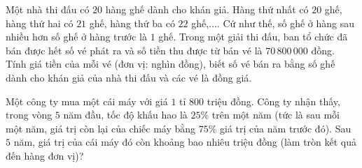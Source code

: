 \begin{bt}%
	Một nhà thi đấu có $20$ hàng ghế dành cho khán giả. Hàng thứ nhất có $20$ ghế, hàng thứ hai có $21$ ghế, hàng thứ ba có $22$ ghế,$\ldots$. Cứ như thế, số ghế ở hàng sau nhiều hơn số ghế ở hàng trước là $1$ ghế. Trong một giải thi đấu, ban tổ chức đã bán được hết số vé phát ra và số tiền thu được từ bán vé là $70\,800\,000$ đồng. Tính giá tiền của mỗi vé (đơn vị: nghìn đồng), biết số vé bán ra bằng số ghế dành cho khán giả của nhà thi đấu và các vé là đồng giá.
\end{bt}

\begin{bt}%
	Một công ty mua một cái máy với giá $1$ tỉ $800$ triệu đồng. Công ty nhận thấy, trong vòng $5$ năm đầu, tốc độ khấu hao là $25\%$ trên một năm (tức là sau mỗi một năm, giá trị còn lại của chiếc máy bằng $75\%$ giá trị của năm trước đó). Sau $5$ năm, giá trị của cái máy đó còn khoảng bao nhiêu triệu đồng (làm tròn kết quả đến hàng đơn vị)?
\end{bt}

